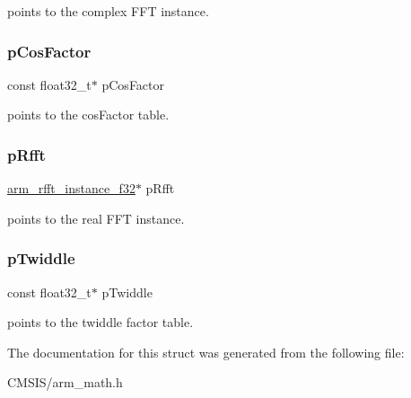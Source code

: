 points to the complex F\+FT instance. \mbox{\label{structarm__dct4__instance__f32_a6978f973c110508f6086347c87eaea7a}} 
\subsubsection{\texorpdfstring{pCosFactor}{pCosFactor}}
{\footnotesize\ttfamily const float32\+\_\+t$\ast$ p\+Cos\+Factor}

points to the cos\+Factor table. \mbox{\label{structarm__dct4__instance__f32_ad4cd7c85eea3f7c5fff4630bbd979e6a}} 
\subsubsection{\texorpdfstring{pRfft}{pRfft}}
{\footnotesize\ttfamily \mbox{\hyperlink{structarm__rfft__instance__f32}{arm\+\_\+rfft\+\_\+instance\+\_\+f32}}$\ast$ p\+Rfft}

points to the real F\+FT instance. \mbox{\label{structarm__dct4__instance__f32_a8292d9775f5c5472f59915649fe3b378}} 
\subsubsection{\texorpdfstring{pTwiddle}{pTwiddle}}
{\footnotesize\ttfamily const float32\+\_\+t$\ast$ p\+Twiddle}

points to the twiddle factor table. 

The documentation for this struct was generated from the following file\+:\begin{DoxyCompactItemize}
\item 
C\+M\+S\+I\+S/arm\+\_\+math.\+h\end{DoxyCompactItemize}
